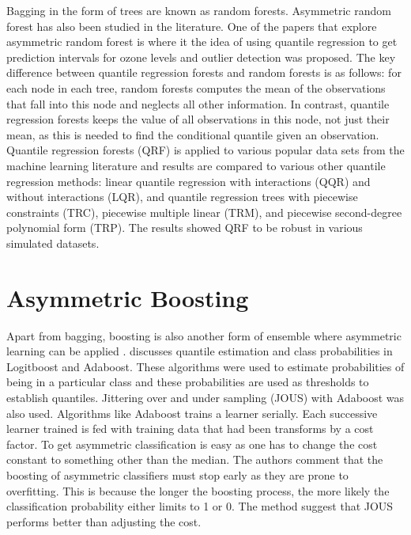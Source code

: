 Bagging in the form of trees are known as random forests. Asymmetric random forest has also been studied in the literature. One of the papers that explore asymmetric random forest is \citet{Meinshausen06} where it the idea of using quantile regression to get prediction intervals for ozone levels and outlier detection was proposed. The key difference between quantile regression forests and random forests is as follows: for each node in each tree, random forests computes the mean of the observations that fall into this node and neglects all other information. In contrast, quantile regression forests keeps the value of all observations in this node, not just their mean, as this is needed to find the conditional quantile given an observation. Quantile regression forests (QRF) is applied to various popular data sets from the machine learning literature and results are compared to various other quantile regression methods: linear quantile regression with interactions (QQR) and without interactions (LQR), and quantile regression trees with piecewise constraints (TRC), piecewise multiple linear (TRM), and piecewise second-degree polynomial form (TRP). The results showed QRF to be robust in various simulated datasets.

\section{Asymmetric Boosting}
Apart from bagging, boosting is also another form of ensemble where asymmetric learning can be applied \citep{Hamed04}. \citet{Mease07} discusses quantile estimation and class probabilities in Logitboost and Adaboost. These algorithms were used to estimate probabilities of being in a particular class and these probabilities are used as thresholds to establish quantiles. Jittering over and under sampling (JOUS) with Adaboost was also used. Algorithms like Adaboost trains a learner serially. Each successive learner trained is fed with training data that had been transforms by a cost factor. To get asymmetric classification is easy as one has to change the cost constant to something other than the median. The authors comment that the boosting of asymmetric classifiers must stop early as they are prone to overfitting. This is because the longer the boosting process, the more likely the classification probability either limits to 1 or 0. The method suggest that JOUS performs better than adjusting the cost. 

